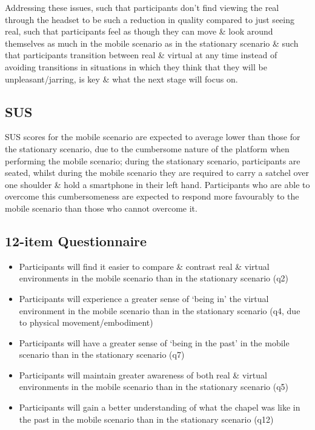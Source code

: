\documentclass[oneside]{book}
\begin{document}
Addressing these issues, such that participants don't find viewing the real through the headset to be such a reduction in quality compared to just seeing real, such that participants feel as though they can move \& look around themselves as much in the mobile scenario as in the stationary scenario \& such that participants transition between real \& virtual at any time instead of avoiding transitions in situations in which they think that they will be unpleasant/jarring, is key \& what the next stage will focus on.


\subsection{SUS}
SUS scores for the mobile scenario are expected to average lower than those for the stationary scenario, due to the cumbersome nature of the platform when performing the mobile scenario; during the stationary scenario, participants are seated, whilst during the mobile scenario they are required to carry a satchel over one shoulder \& hold a smartphone in their left hand. Participants who are able to overcome this cumbersomeness are expected to respond more favourably to the mobile scenario than those who cannot overcome it.

\subsection{12-item Questionnaire}
\begin{itemize}
	\item Participants will find it easier to compare \& contrast real \& virtual environments in the mobile scenario than in the stationary scenario (q2)
	\item Participants will experience a greater  sense of `being in' the virtual environment in the mobile scenario than in the stationary scenario (q4, due to physical movement/embodiment)
	\item Participants will have a greater sense of `being in the past' in the mobile scenario than in the stationary scenario (q7)
	\item Participants will maintain greater awareness of both real \& virtual environments in the mobile scenario than in the stationary scenario (q5)
	\item Participants will gain a better understanding of what the chapel was like in the past in the mobile scenario than in the stationary scenario (q12)
\end{itemize}
\end{document}
